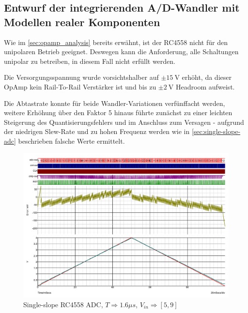 \documentclass[
	ngerman,
	parskip=half,
	headsepline,
	twocolumn,
	DIV=calc,
	listof=leveldown,
	]{scrartcl}
\begin{document}
		\subsection{Entwurf der integrierenden A/D-Wandler mit Modellen realer Komponenten}		
		
		Wie im \cref{sec:opamp_analysis} bereits erwähnt, ist der RC4558 nicht für den unipolaren Betrieb geeignet. Deswegen kann die Anforderung, alle Schaltungen unipolar zu betreiben, in diesem Fall nicht erfüllt werden. 
		
		Die Versorgungsspannung wurde vorsichtshalber auf $\pm \SI{15}{\volt} $ erhöht, da dieser OpAmp kein Rail-To-Rail Verstärker ist und bis zu $\pm \SI{2}{\volt} $ Headroom aufweist. 
		
		Die Abtastrate konnte für beide Wandler-Variationen verfünffacht werden, weitere Erhöhung über den Faktor 5 hinaus führte zunächst zu einer leichten Steigerung des Quantisierungsfehlers und im Anschluss zum Versagen - aufgrund der niedrigen Slew-Rate und zu hohen Frequenz werden wie in \cref{sec:single-slope-adc} beschrieben falsche Werte ermittelt. 
		
		\begin{figure}
			\centering
			\includegraphics[width=\linewidth]{RC4558_single_slope}
			\caption[Single-slope RC4558 ADC]{Single-slope RC4558 ADC, $T \Rightarrow 1.6\mu s$, $V_{in} \Rightarrow [5,  9]$}
			\label{fig:single-slope-RC4558}
		\end{figure}	
	
\end{document}
